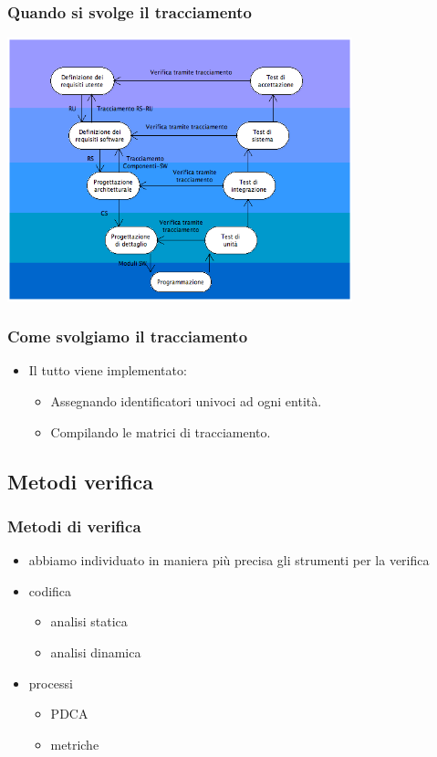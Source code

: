 \begin{frame}
\frametitle{Quando si svolge il tracciamento}
\begin{center}
  \includegraphics[width=10cm]{img/Vmodel.png}
\end{center}
\end{frame}

\begin{frame}
\frametitle{Come svolgiamo il tracciamento}

\begin{itemize}
\item Il tutto viene implementato:
	\begin{itemize}
		\item Assegnando identificatori univoci ad ogni entità.
		\item Compilando le matrici di tracciamento.
	\end{itemize}
\end{itemize}

\end{frame}

\subsection{Metodi verifica}

\begin{frame}
\frametitle{Metodi di verifica}

\begin{itemize}
\item abbiamo individuato in maniera più precisa gli strumenti per la verifica
\item codifica
\begin{itemize}
\item analisi statica
\item analisi dinamica
\end{itemize}
\item processi
\begin{itemize}
\item PDCA
\item metriche
\end{itemize}
\end{itemize}

\end{frame}

